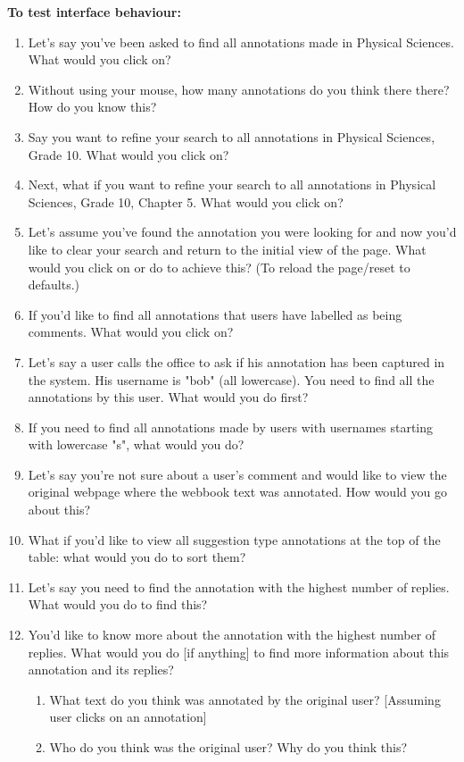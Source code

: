 \textbf{To test interface behaviour:}
\begin{enumerate}
 \item Let's say you've been asked to find all annotations made in Physical Sciences. What would you click on?
 \item Without using your mouse, how many annotations do you think there there? How do you know this?
 \item Say you want to refine your search to all annotations in Physical Sciences, Grade 10. What would you click on?
 \item Next, what if you want to refine your search to all annotations in Physical Sciences, Grade 10, Chapter 5. What would you click on?
 \item Let's assume you've found the annotation you were looking for and now you'd like to clear your search and return to the initial view of the page. What would you click on or do to achieve this? (To reload the page/reset to defaults.)
 \item If you'd like to find all annotations that users have labelled as being comments. What would you click on?
 \item Let's say a user calls the office to ask if his annotation has been captured in the system. His username is "bob" (all lowercase). You need to find all the annotations by this user. What would you do first?
 \item If you need to find all annotations made by users with usernames starting with lowercase "s", what would you do?
 \item Let's say you're not sure about a user's comment and would like to view the original webpage where the webbook text was annotated. How would you go about this?
 \item What if you'd like to view all suggestion type annotations at the top of the table:  what would you do to sort them? 
 \item Let's say you need to find the annotation with the highest number of replies. What would you do to find this?
 \item You'd like to know more about the annotation with the highest number of replies. What would you do [if anything] to find more information about this annotation and its replies? 
 \begin{enumerate}
 \item  What text do you think was annotated by the original user? [Assuming user clicks on an annotation]
 \item Who do you think was the original user? Why do you think this?

\end{enumerate}
\end{enumerate}
